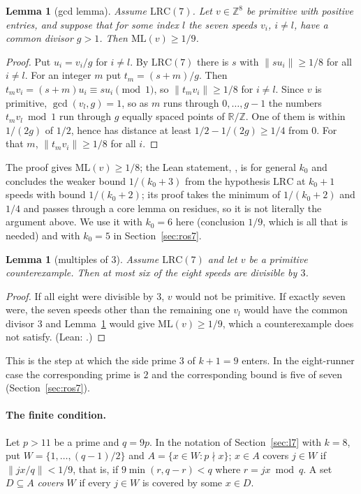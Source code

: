 \documentclass[11pt]{article}
\newtheorem{lemma}[theorem]{Lemma}
\theoremstyle{remark}
\newcommand{\ML}{\mathrm{ML}}
\newcommand{\R}{\mathbb{R}}
\newcommand{\Z}{\mathbb{Z}}
\newcommand{\dist}[1]{\lVert #1\rVert}
\begin{document}
\begin{lemma}[gcd lemma]\label{lem:gcd}
Assume $\mathrm{LRC}(7)$. Let $v\in\Z^8$ be primitive with positive entries, and suppose that for some index $l$ the seven speeds $v_i$, $i\ne l$, have a common divisor $g>1$. Then $\ML(v)\ge1/9$.
\end{lemma}
\begin{proof}
Put $u_i=v_i/g$ for $i\ne l$. By $\mathrm{LRC}(7)$ there is $s$ with $\dist{su_i}\ge1/8$ for all $i\ne l$. For an integer $m$ put $t_m=(s+m)/g$. Then $t_mv_i=(s+m)u_i\equiv su_i\pmod1$, so $\dist{t_mv_i}\ge 1/8$ for $i\ne l$. Since $v$ is primitive, $\gcd(v_l,g)=1$, so as $m$ runs through $0,\dots,g-1$ the numbers $t_mv_l \bmod 1$ run through $g$ equally spaced points of $\R/\Z$. One of them is within $1/(2g)$ of $1/2$, hence has distance at least $1/2-1/(2g)\ge1/4$ from $0$. For that $m$, $\dist{t_mv_i}\ge1/8$ for all $i$.
\end{proof}
The proof gives $\ML(v)\ge1/8$; the Lean statement, , is for general $k_0$ and concludes the weaker bound $1/(k_0+3)$ from the hypothesis $\mathrm{LRC}$ at $k_0+1$ speeds with bound $1/(k_0+2)$; its proof takes the minimum of $1/(k_0+2)$ and $1/4$ and passes through a core lemma on residues, so it is not literally the argument above. We use it with $k_0=6$ here (conclusion $1/9$, which is all that is needed) and with $k_0=5$ in Section~\ref{sec:ros7}.

\begin{lemma}[multiples of $3$]\label{lem:three}
Assume $\mathrm{LRC}(7)$ and let $v$ be a primitive counterexample. Then at most six of the eight speeds are divisible by $3$.
\end{lemma}
\begin{proof}
If all eight were divisible by $3$, $v$ would not be primitive. If exactly seven were, the seven speeds other than the remaining one $v_l$ would have the common divisor $3$ and Lemma~\ref{lem:gcd} would give $\ML(v)\ge1/9$, which a counterexample does not satisfy. (Lean: .)
\end{proof}
This is the step at which the side prime $3$ of $k+1=9$ enters. In the eight-runner case the corresponding prime is $2$ and the corresponding bound is five of seven (Section~\ref{sec:ros7}).

\paragraph{The finite condition.} Let $p>11$ be a prime and $q=9p$. In the notation of Section~\ref{sec:l7} with $k=8$, put $W=\{1,\dots,(q-1)/2\}$ and $A=\{x\in W: p\nmid x\}$; $x\in A$ covers $j\in W$ if $\dist{jx/q}<1/9$, that is, if $9\min(r,q-r)<q$ where $r=jx\bmod q$. A set $D\subseteq A$ \emph{covers} $W$ if every $j\in W$ is covered by some $x\in D$.
\end{document}
